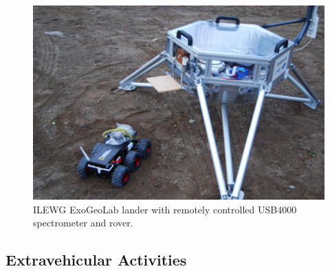 \documentclass[preprint]{elsarticle}
\begin{document}
\begin{figure}
\centering
\includegraphics{img/figure01.png}
\caption{ILEWG ExoGeoLab lander with remotely controlled USB4000 spectrometer and rover.}
\label{fig:f01}
\end{figure}

\subsection{Extravehicular Activities}
\end{document}

